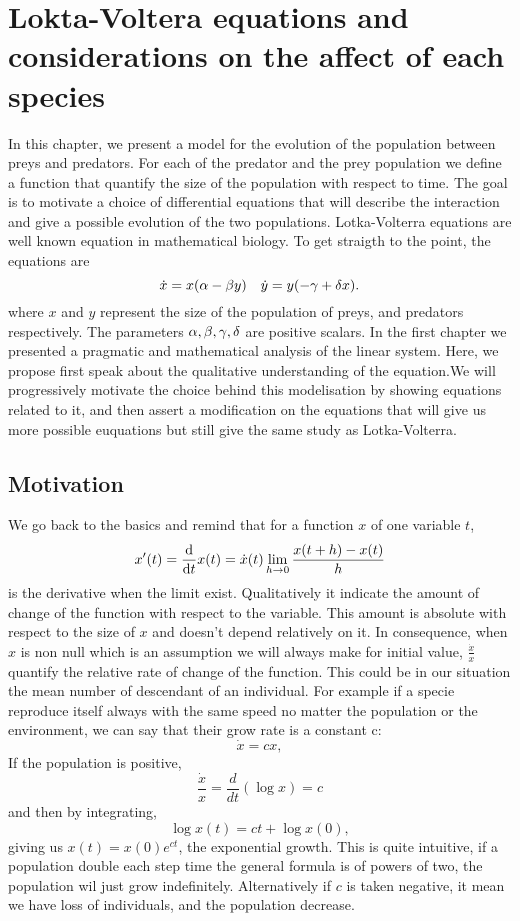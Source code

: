 \chapter{Lokta-Voltera equations and considerations on the affect of each species}

In this chapter, we present a model for the evolution of the population between preys and predators. For each of the predator and the prey population we define a function that quantify the size of the population with respect to time. The goal is to motivate a choice of differential equations that will describe the interaction and give a possible evolution of the two populations. Lotka-Volterra equations are well known equation in mathematical biology. To get straigth to the point, the equations are
\[\dot{x}=x(\alpha-\beta y) \quad  \dot{y} = y(-\gamma + \delta x).\]
where $x$ and $y$ represent the size of the population of preys, and predators respectively. The parameters $\alpha,\beta,\gamma,\delta$ are positive scalars. In the first chapter we presented a pragmatic and mathematical analysis of the linear system. Here, we propose first speak about the qualitative understanding of the equation.We will progressively motivate the choice behind this modelisation by showing equations related to it, and then assert a modification on the equations that will give us more possible euquations but still give the same study as Lotka-Volterra.

\section{Motivation} \label{sec:motiv}
We go back to the basics and remind that for a function $x$ of one variable $t$, 
\[x'(t) = \frac{\mathrm{d}}{\mathrm{d} t}x(t) = \dot{x}(t) \lim_{h\to0}\frac{x(t+h)-x(t)}{h}\] 
is the derivative when the limit exist. Qualitatively it indicate the amount of change of the function with respect to the variable. This amount is absolute with respect to the size of $x$ and doesn't depend relatively on it. In consequence, when $x$ is non null which is an assumption we will always make for initial value, $\frac{\dot{x}}{x}$ quantify the relative rate of change of the function. This could be in our situation the mean number of descendant of an individual. For example if a specie reproduce itself always with the same speed no matter the population or the environment, we can say that their grow rate is a constant c:
\[ \dot{x} = cx, \]
If the population is positive, 
\[ \frac{\dot{x}}{x} = \frac{d}{dt}(\log{x}) = c \]
and then by integrating,
\[ \log{x(t)} = ct + \log{x(0)}, \]
giving us $x(t) = x(0)e^{ct}$, the exponential growth. This is quite intuitive, if a population double each step time the general formula is of powers of two, the population wil just grow indefinitely. Alternatively if $c$ is taken negative, it mean we have loss of individuals, and the population decrease.

